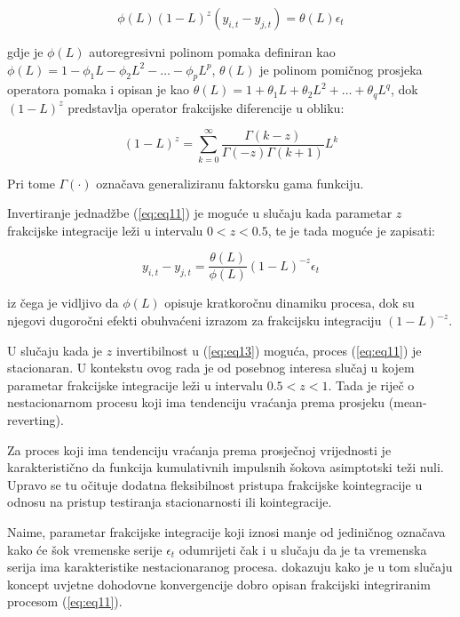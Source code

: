 \documentclass{crebsshr}
\begin{document}
\begin{equation} \label{eq:eq11}
\phi(L)(1-L)^z (y_{i,t} - y_{j,t}) = \theta(L)\epsilon_t
\end{equation}

gdje je \( \phi(L) \) autoregresivni polinom pomaka definiran kao \( \phi(L) = 1 - \phi_1 L - \phi_2 L^2 - \dots - \phi_p L^p \), \( \theta(L) \) je polinom pomičnog prosjeka operatora pomaka i opisan je kao \( \theta(L) = 1 + \theta_1 L + \theta_2 L^2 + \dots + \theta_q L^q \), dok \( (1-L)^z \) predstavlja operator frakcijske diferencije u obliku:

\begin{equation} \label{eq:eq12}
(1-L)^z = \sum_{k=0}^{\infty} \frac{\Gamma(k-z)}{\Gamma(-z)\Gamma(k+1)} L^k
\end{equation}

Pri tome \( \Gamma(\cdot) \) označava generaliziranu faktorsku gama funkciju.

Invertiranje jednadžbe (\ref{eq:eq11}) je moguće u slučaju kada parametar \( z \) frakcijske integracije leži u intervalu \( 0<z<0.5 \), te je tada moguće je zapisati:

\begin{equation} \label{eq:eq13}
y_{i,t} - y_{j,t} = \frac{\theta(L)}{\phi(L)}(1-L)^{-z}\epsilon_t
\end{equation}

iz čega je vidljivo da \( \phi(L) \) opisuje kratkoročnu dinamiku procesa, dok su njegovi dugoročni efekti obuhvaćeni izrazom za frakcijsku integraciju \( (1-L)^{-z} \).

U slučaju kada je \( z \) invertibilnost u (\ref{eq:eq13}) moguća, proces (\ref{eq:eq11}) je stacionaran. U kontekstu ovog rada je od posebnog interesa slučaj u kojem parametar frakcijske integracije leži u intervalu \( 0.5<z<1 \). Tada je riječ o nestacionarnom procesu koji ima tendenciju vraćanja prema prosjeku (mean-reverting).

Za proces koji ima tendenciju vraćanja prema prosječnoj vrijednosti je karakteristično da funkcija kumulativnih impulsnih šokova asimptotski teži nuli. Upravo se tu očituje dodatna fleksibilnost pristupa frakcijske kointegracije u odnosu na pristup testiranja stacionarnosti ili kointegracije.

Naime, parametar frakcijske integracije koji iznosi manje od jediničnog označava kako će šok vremenske serije \( \epsilon_t \) odumrijeti čak i u slučaju da je ta vremenska serija ima karakteristike nestacionaranog procesa. \cite{mello-guimaraes:07} dokazuju kako je u tom slučaju koncept uvjetne dohodovne konvergencije dobro opisan frakcijski integriranim procesom (\ref{eq:eq11}).
\end{document}
